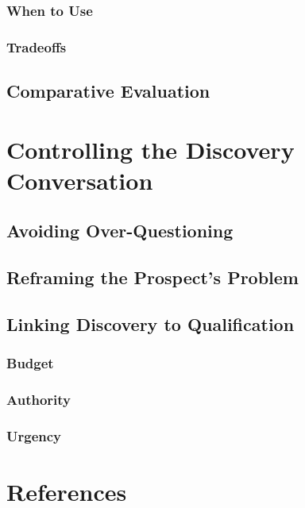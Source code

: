         \subsubsection{When to Use}\mbox{}
        \subsubsection{Tradeoffs}\mbox{}
    \subsection{Comparative Evaluation}\mbox{}

\section{Controlling the Discovery Conversation}\mbox{}
    \subsection{Avoiding Over-Questioning}\mbox{}
    \subsection{Reframing the Prospect's Problem}\mbox{}
    \subsection{Linking Discovery to Qualification}\mbox{}
        \subsubsection{Budget}\mbox{}
        \subsubsection{Authority}\mbox{}
        \subsubsection{Urgency}\mbox{}

\section{References}\mbox{}